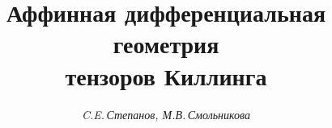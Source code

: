 

 


% 


 


\newcommand{\Ric}{\operatorname{Ric}} 


\newcommand{\trace}{\operatorname{trace}} 


\newcommand{\const}{\operatorname{const}} 


\newcommand{\tts}[1]{} 




\renewcommand{\baselinestretch}{0.97}


 




\setcounter{page}{82} 












 


\author{\it C.E.\,Степанов, М.В.\,Смольникова} 




\title{Аффинная дифференциальная геометрия\\ тензоров Киллинга} 


 


\date{} 




\pagestyle{plain} %


 





